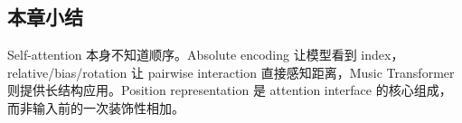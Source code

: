 
\subsection{本章小结}

Self-attention 本身不知道顺序。Absolute encoding 让模型看到 index，relative/bias/rotation 让 pairwise interaction 直接感知距离，Music Transformer 则提供长结构应用。Position representation 是 attention interface 的核心组成，而非输入前的一次装饰性相加。

